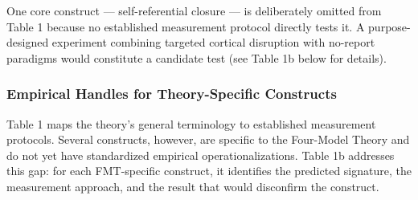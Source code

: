 \documentclass[12pt]{article}
\newcommand{\revstart}{}
\begin{document}
{\revstart One core construct --- self-referential closure --- is deliberately omitted from Table 1 because no established measurement protocol directly tests it. A purpose-designed experiment combining targeted cortical disruption with no-report paradigms \citep{Tsuchiya2015} would constitute a candidate test (see Table 1b below for details).

\subsubsection{Empirical Handles for Theory-Specific Constructs}

Table 1 maps the theory's general terminology to established measurement protocols. Several constructs, however, are specific to the Four-Model Theory and do not yet have standardized empirical operationalizations. Table 1b addresses this gap: for each FMT-specific construct, it identifies the predicted signature, the measurement approach, and the result that would disconfirm the construct.

}
\end{document}
